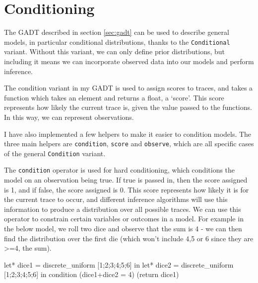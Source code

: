 	
\section{Conditioning} \label{sec:condition}
	
The GADT described in section \ref{sec:gadt} can be used to describe general models, in particular conditional distributions, thanks to the \texttt{Conditional} variant. Without this variant, we can only define prior distributions, but including it means we can incorporate observed data into our models and perform inference.
	
The condition variant in my GADT is used to assign scores to traces, and takes a function which takes an element and returns a float, a `score'. This score represents how likely the current trace is, given the value passed to the functions. In this way, we can represent observations.
		
I have also implemented a few helpers to make it easier to condition models. The three main helpers are \texttt{condition}, \texttt{score} and \texttt{observe}, which are all specific cases of the general \texttt{Condition} variant. 
		
The \texttt{condition} operator is used for hard conditioning, which conditions the model on an observation being true. If true is passed in, then the score assigned is 1, and if false, the score assigned is 0. This score represents how likely it is for the current trace to occur, and different inference algorithms will use this information to produce a distribution over all possible traces. We can use this operator to constrain certain variables or outcomes in a model. For example in the below model, we roll two dice and observe that the sum is 4 - we can then find the distribution over the first die (which won't include 4,5 or 6 since they are >=4, the sum).
		
\begin{ocamlcode-in}
let* dice1 = discrete_uniform [1;2;3;4;5;6] in
let* dice2 = discrete_uniform [1;2;3;4;5;6] in
condition (dice1+dice2 = 4)
	(return dice1)
\end{ocamlcode-in}
				
